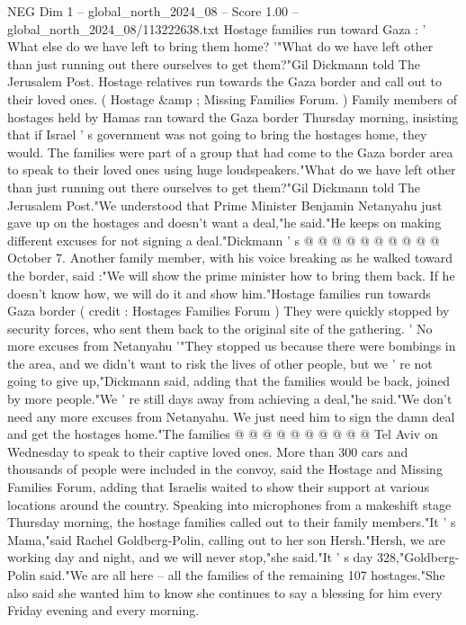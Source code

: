 \begin{textsample}{NEG Dim 1 – global\_north\_2024\_08 – Score 1.00 – global\_north\_2024\_08/113222638.txt}  \label{ex:f1_neg_386}
Hostage families run toward Gaza : ' What else do we have left to bring them home? '"What do we have left other than just running out there ourselves to get them?"Gil Dickmann told The Jerusalem Post.
Hostage relatives run towards the Gaza border and call out to their loved ones. ( Hostage \&amp ; Missing Families Forum. ) Family members of hostages held by Hamas ran toward the Gaza border Thursday morning, insisting that if Israel ' s government was not going to bring the hostages home, they would.
The families were part of a group that had come to the Gaza border area to speak to their loved ones using huge loudspeakers."What do we have left other than just running out there ourselves to get them?"Gil Dickmann told The Jerusalem Post."We understood that Prime Minister Benjamin Netanyahu just gave up on the hostages and doesn't want a deal,"he said."He keeps on making different excuses for not signing a deal."Dickmann ' s @ @ @ @ @ @ @ @ @ @ October 7.
Another family member, with his voice breaking as he walked toward the border, said :"We will show the prime minister how to bring them back.
If he doesn't know how, we will do it and show him."Hostage families run towards Gaza border ( credit : Hostages Families Forum ) They were quickly stopped by security forces, who sent them back to the original site of the gathering. ' No more excuses from Netanyahu '"They stopped us because there were bombings in the area, and we didn't want to risk the lives of other people, but we ' re not going to give up,"Dickmann said, adding that the families would be back, joined by more people."We ' re still days away from achieving a deal,"he said."We don't need any more excuses from Netanyahu.
We just need him to sign the damn deal and get the hostages home."The families @ @ @ @ @ @ @ @ @ @ Tel Aviv on Wednesday to speak to their captive loved ones.
More than 300 cars and thousands of people were included in the convoy, said the Hostage and Missing Families Forum, adding that Israelis waited to show their support at various locations around the country.
Speaking into microphones from a makeshift stage Thursday morning, the hostage families called out to their family members."It ' s Mama,"said Rachel Goldberg-Polin, calling out to her son Hersh."Hersh, we are working day and night, and we will never stop,"she said."It ' s day 328,"Goldberg-Polin said."We are all here -- all the families of the remaining 107 hostages."She also said she wanted him to know she continues to say a blessing for him every Friday evening and every morning.

\end{textsample}
